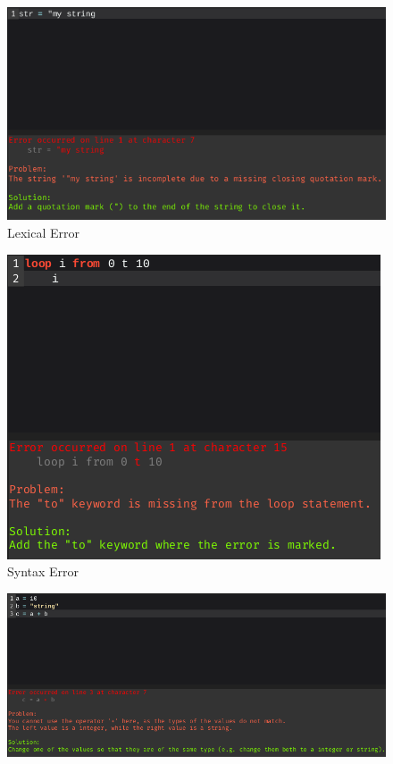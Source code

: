 \documentclass[
]{report}
\begin{document}
\begin{appendices}
	\begin{figure}
		\centering
		\includegraphics[width=\textwidth]{lexical-error}
		\caption{Lexical Error}
		\label{fig:lexical-error}
	\end{figure}
	\begin{figure}
		\centering
		\includegraphics[width=\textwidth]{syntax-error}
		\caption{Syntax Error}
		\label{fig:syntax-error}
	\end{figure}
	\begin{figure}
		\centering
		\includegraphics[width=\textwidth]{semantic-error}

\end{figure}
\end{appendices}
\end{document}
